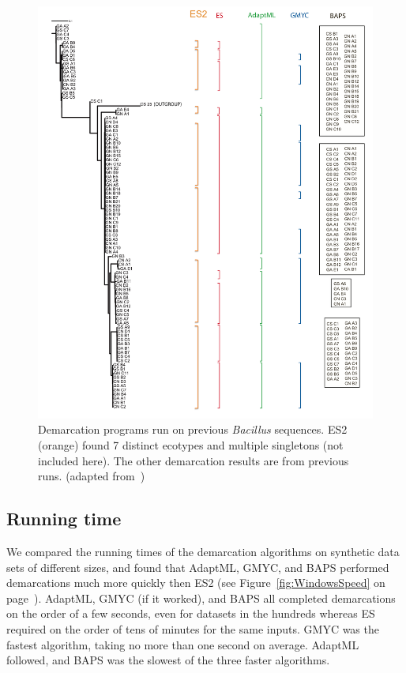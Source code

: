 \begin{figure}[h!]
  \centering
    \includegraphics[scale=0.4]{images/Bacillus-CH4}
      \caption[Demarcation programs run on previous \emph{Bacillus} sequences.]{Demarcation programs run on previous \emph{Bacillus} sequences. ES2 (orange) found 7 distinct ecotypes and multiple singletons (not included here). The other demarcation results are from previous runs. (adapted from~\protect\cite{carlo})}
    \label{fig:Bacillus}
\end{figure}

\subsection*{Running time}
We compared the running times of the demarcation algorithms on synthetic data sets of different sizes, and found that AdaptML, GMYC, and BAPS performed demarcations much more quickly then ES2 (see Figure~\ref{fig:WindowsSpeed} on page~\pageref{fig:WindowsSpeed}).
AdaptML, GMYC (if it worked), and BAPS all completed demarcations on the order of a few seconds, even for datasets in the hundreds whereas ES required on the order of tens of minutes for the same inputs.
GMYC was the fastest algorithm, taking no more than one second on average.
AdaptML followed, and BAPS was the slowest of the three faster algorithms.

